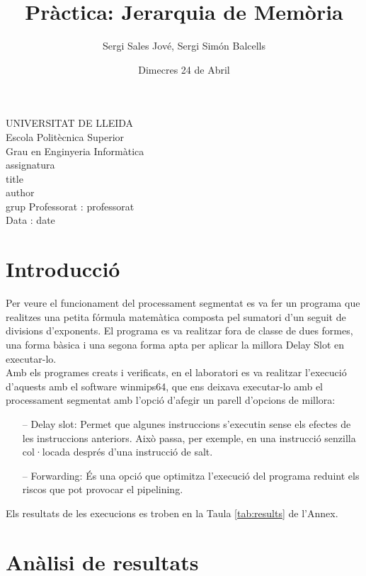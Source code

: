 \documentclass{article}
\title{Pràctica: Jerarquia de Memòria}
\author{Sergi Sales Jové, Sergi Simón Balcells}
\date{Dimecres 24 de Abril}
\renewcommand{\maketitle}{ %
    \begin{titlepage}
        \raggedright{UNIVERSITAT DE LLEIDA \\
            Escola Politècnica Superior \\
            Grau en Enginyeria Informàtica\\
            \1assignatura\\}
            \vspace{5cm}
            \centering\huge{\5title \\}
            \vspace{3cm}
            \large{\6author} \\
            \normalsize{\3grup}
            \vfill
            Professorat : \4professorat \\
            Data : \7date
\end{titlepage}}
\begin{document}
\maketitle
\thispagestyle{empty}

\newpage
{}
\tableofcontents
\listoftables
\newpage
{}
\section{Introducció}
Per veure el funcionament del processament segmentat es va fer un programa que realitzes una petita fórmula matemàtica composta pel sumatori d'un seguit de divisions d'exponents. El programa es va realitzar fora de classe de dues formes, una forma bàsica i una segona forma apta per aplicar la millora Delay Slot en executar-lo.\\
Amb els programes creats i verificats, en el laboratori es va realitzar l'execució d'aquests amb el software winmips64, que ens deixava executar-lo amb el processament segmentat amb l'opció d'afegir un parell d'opcions de millora:
\begin{itemize}
\item[--]{Delay slot:} Permet que algunes instruccions s'executin sense els efectes de les instruccions anteriors. Això passa, per exemple, en una instrucció senzilla col·locada després d'una instrucció de salt.
\item[--]{Forwarding:} És una opció que optimitza l'execució del programa reduint els riscos que pot provocar el pipelining.
\end{itemize}
Els resultats de les execucions es troben en la Taula \ref{tab:results} de l'Annex.
\section{Anàlisi de resultats}
\end{document}
